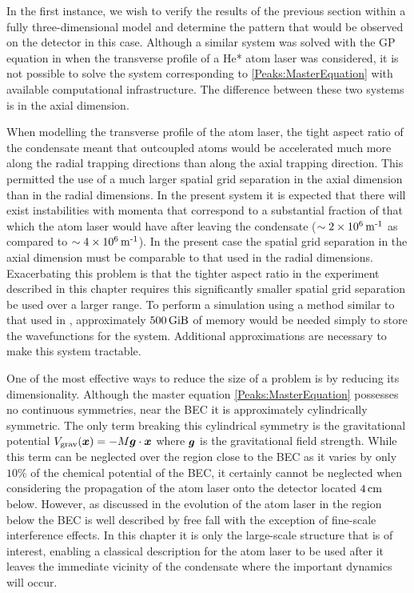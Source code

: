 In the first instance, we wish to verify the results of the previous section within a fully three-dimensional model and determine the pattern that would be observed on the detector in this case. Although a similar system was solved with the GP equation in  when the transverse profile of a He* atom laser was considered, it is not possible to solve the system corresponding to \eqref{Peaks:MasterEquation} with available computational infrastructure. The difference between these two systems is in the axial dimension.

When modelling the transverse profile of the atom laser, the tight aspect ratio of the condensate meant that outcoupled atoms would be accelerated much more along the radial trapping directions than along the axial trapping direction. This permitted the use of a much larger spatial grid separation in the axial dimension than in the radial dimensions. In the present system it is expected that there will exist instabilities with momenta that correspond to a substantial fraction of that which the atom laser would have after leaving the condensate ($\sim \unit[2 \times 10^6]{m\textsuperscript{-1}}$ as compared to $\sim \unit[4 \times 10^6]{m\textsuperscript{-1}}$). In the present case the spatial grid separation in the axial dimension must be comparable to that used in the radial dimensions. Exacerbating this problem is that the tighter aspect ratio in the experiment described in this chapter requires this significantly smaller spatial grid separation be used over a larger range. To perform a simulation using a method similar to that used in , approximately $\unit[500]{GiB}$ of memory would be needed simply to store the wavefunctions for the system. Additional approximations are necessary to make this system tractable.

One of the most effective ways to reduce the size of a problem is by reducing its dimensionality. Although the master equation \eqref{Peaks:MasterEquation} possesses no continuous symmetries, near the BEC it is approximately cylindrically symmetric. The only term breaking this cylindrical symmetry is the gravitational potential $V_\text{grav}(\bm{x}) =- M \bm{g} \cdot \bm{x}$ where $\bm{g}$ is the gravitational field strength. While this term can be neglected over the region close to the BEC as it varies by only $10\%$ of the chemical potential of the BEC, it certainly cannot be neglected when considering the propagation of the atom laser onto the detector located $\unit[4]{cm}$ below. However, as discussed in  the evolution of the atom laser in the region below the BEC is well described by free fall with the exception of fine-scale interference effects. In this chapter it is only the large-scale structure that is of interest, enabling a classical description for the atom laser to be used after it leaves the immediate vicinity of the condensate where the important dynamics will occur.


